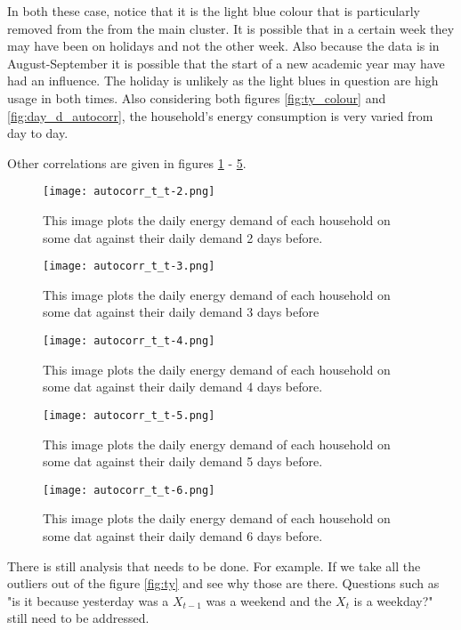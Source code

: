 \documentclass[a4paper]{article}
\begin{document}
In both these case, notice that it is the light blue colour that is particularly removed from the from the main cluster. It is possible that in a certain week they may have been on holidays and not the other week. Also because the data is in August-September it is possible that the start of a new academic year may have had an influence. The holiday is unlikely as the light blues in question are high usage in both times. Also considering both figures \ref{fig:ty_colour} and \ref{fig:day_d_autocorr}, the household's energy consumption is very varied from day to day.

Other correlations are given in figures \ref{fig:day_2_autocorr} - \ref{fig:day_6_autocorr}.

\begin{figure}
\centering
\texttt{[image: autocorr\_t\_t-2.png]}
\caption{This image plots the daily energy demand of each household on some dat against their daily demand 2 days before.}
\label{fig:day_2_autocorr} 
\end{figure}

\begin{figure}
\centering
\texttt{[image: autocorr\_t\_t-3.png]}
\caption{This image plots the daily energy demand of each household on some dat against their daily demand 3 days before}
\label{fig:day_3_autocorr} 
\end{figure}

\begin{figure}
\centering
\texttt{[image: autocorr\_t\_t-4.png]}
\caption{This image plots the daily energy demand of each household on some dat against their daily demand 4 days before.}
\label{fig:day_4_autocorr} 
\end{figure}

\begin{figure}
\centering
\texttt{[image: autocorr\_t\_t-5.png]}
\caption{This image plots the daily energy demand of each household on some dat against their daily demand 5 days before.}
\label{fig:day_5_autocorr} 
\end{figure}

\begin{figure}
\centering
\texttt{[image: autocorr\_t\_t-6.png]}
\caption{This image plots the daily energy demand of each household on some dat against their daily demand 6 days before.}
\label{fig:day_6_autocorr} 
\end{figure}


There is still analysis that needs to be done. For example. If we take all the outliers out of the figure \ref{fig:ty} and see why those are there. Questions such as "is it because yesterday was a $X_{t-1}$ was a weekend and the $X_t$ is a weekday?" still need to be addressed.
\end{document}
